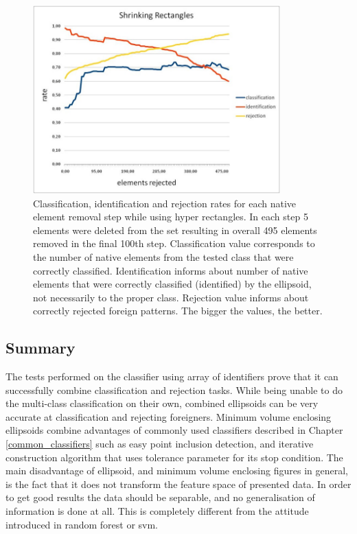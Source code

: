 \begin{figure}[htp]
	\centering
	\includegraphics[width=0.85\textwidth]{Figures/shrinking_rectangles_elements_rejection.jpg}
	\caption{ Classification, identification and rejection rates for each native element removal step while using hyper rectangles. In each step 5 elements were deleted from the set resulting in overall 495 elements removed in the final 100th step. Classification value corresponds to the number of native elements from the tested class that were correctly classified. Identification informs about number of native elements that were correctly classified (identified) by the ellipsoid, not necessarily to the proper class. Rejection value informs about correctly rejected foreign patterns. The bigger the values, the better. }
	\label{fig:shrinking_rectangles_elements_rejection}\vspace{-3pt}
\end{figure}

\subsection{Summary}

The tests performed on the classifier using array of identifiers prove that it can successfully combine classification and rejection tasks. While being unable to do the multi-class classification on their own, combined ellipsoids can be very accurate at classification and rejecting foreigners. Minimum volume enclosing ellipsoids combine advantages of commonly used classifiers described in Chapter \ref{common_classifiers} such as easy point inclusion detection, and iterative construction algorithm that uses tolerance parameter for its stop condition. The main disadvantage of ellipsoid, and minimum volume enclosing figures in general, is the fact that it does not transform the feature space of presented data. In order to get good results the data should be separable, and no generalisation of information is done at all. This is completely different from the attitude introduced in random forest or svm.
